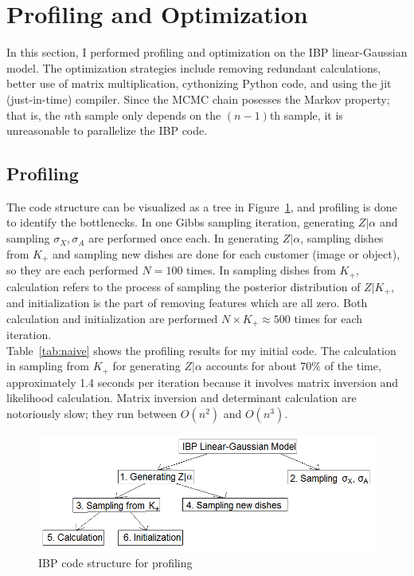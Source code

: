 \section{Profiling and Optimization}
In this section, I performed profiling and optimization on the IBP linear-Gaussian model. The optimization strategies include removing redundant calculations, better use of matrix multiplication, cythonizing Python code, and using the jit (just-in-time) compiler. Since the MCMC chain posesses the Markov property; that is, the $n$th sample only depends on the $(n-1)$th sample, it is unreasonable to parallelize the IBP code.

\subsection{Profiling}
The code structure can be visualized as a tree in Figure~\ref{fig:profiling}, and profiling is done to identify the bottlenecks. In one Gibbs sampling iteration, generating $Z|\alpha$ and sampling $\sigma_X,\sigma_A$ are performed once each. In generating $Z|\alpha$, sampling dishes from $K_+$ and sampling new dishes are done for each customer (image or object), so they are each performed $N=100$ times. In sampling dishes from $K_+$, calculation refers to the process of sampling the posterior distribution of $Z|K_+$, and initialization is the part of removing features which are all zero. Both calculation and initialization are performed $N\times K_+ \approx 500$ times for each iteration.\\

Table~\ref{tab:naive} shows the profiling results for my initial code. The calculation in sampling from $K_+$ for generating $Z|\alpha$ accounts for about 70\% of the time, approximately 1.4 seconds per iteration because it involves matrix inversion and likelihood calculation. Matrix inversion and determinant calculation are notoriously slow; they run between $O(n^2)$ and $O(n^3)$.

\begin{figure}[!ht]
\centering
    \includegraphics[width=\linewidth]{More_Images/IBP_profiling.png}
    \caption{IBP code structure for profiling}
    \label{fig:profiling}
\end{figure}

